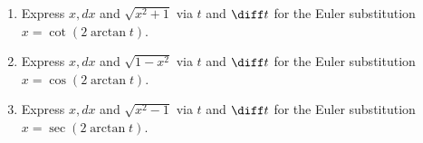 \begin{enumerate}
\item Express $x, dx $ and $\sqrt{x^2+1}$ via $t$ and $\diff t$ for the Euler substitution $x=\cot(2\arctan t)$.
\item Express $x, dx $ and $\sqrt{1-x^2}$ via $t$ and $\diff t$ for the Euler substitution $x=\cos(2\arctan t)$.
\item Express $x, dx $ and $\sqrt{x^2-1}$ via $t$ and $\diff t$ for the Euler substitution $x=\sec(2\arctan t)$.
\end{enumerate}